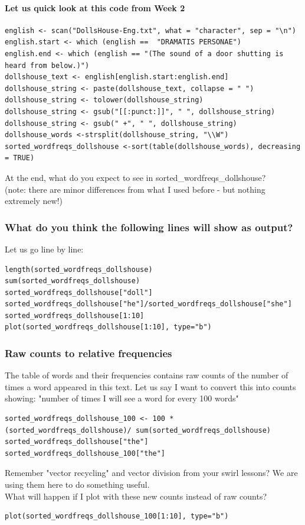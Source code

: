 \documentclass{beamer}
\begin{document}
\begin{frame}[fragile]
\framesubtitle{Let us quick look at this code from Week 2}
\tiny
\begin{verbatim}
english <- scan("DollsHouse-Eng.txt", what = "character", sep = "\n")
english.start <- which (english ==  "DRAMATIS PERSONAE")
english.end <- which (english == "(The sound of a door shutting is heard from below.)")
dollshouse_text <- english[english.start:english.end]
dollshouse_string <- paste(dollshouse_text, collapse = " ")
dollshouse_string <- tolower(dollshouse_string)
dollshouse_string <- gsub("[[:punct:]]", " ", dollshouse_string)
dollshouse_string <- gsub(" +", " ", dollshouse_string)
dollshouse_words <-strsplit(dollshouse_string, "\\W")
sorted_wordfreqs_dollshouse <-sort(table(dollshouse_words), decreasing = TRUE)
\end{verbatim}
\normalsize At the end, what do you expect to see in sorted\_wordfreqs\_dollshouse? 
\\ (note: there are minor differences from what I used before - but nothing extremely new!)
\end{frame}

\begin{frame}[fragile]
\frametitle{What do you think the following lines will show as output?}
Let us go line by line: 
\footnotesize
\begin{verbatim}
length(sorted_wordfreqs_dollshouse)
sum(sorted_wordfreqs_dollshouse)
sorted_wordfreqs_dollshouse["doll"]
sorted_wordfreqs_dollshouse["he"]/sorted_wordfreqs_dollshouse["she"]
sorted_wordfreqs_dollshouse[1:10]
plot(sorted_wordfreqs_dollshouse[1:10], type="b")
\end{verbatim}
\end{frame}

\begin{frame}[fragile]
\frametitle{Raw counts to relative frequencies}
The table of words and their frequencies contains raw counts of the number of times a word appeared in this text. Let us say I want to convert this into counts showing: "number of times I will see a word for every 100 words"
\tiny
\begin{verbatim}
sorted_wordfreqs_dollshouse_100 <- 100 * (sorted_wordfreqs_dollshouse)/ sum(sorted_wordfreqs_dollshouse)
sorted_wordfreqs_dollshouse["the"]
sorted_wordfreqs_dollshouse_100["the"]
\end{verbatim}
\normalsize Remember "vector recycling" and vector division from your swirl lessons? We are using them here to do something useful. 
\\ What will happen if I plot with these new counts instead of raw counts?
\tiny \begin{verbatim}
plot(sorted_wordfreqs_dollshouse_100[1:10], type="b")
\end{verbatim}
\end{frame}
\end{document}
